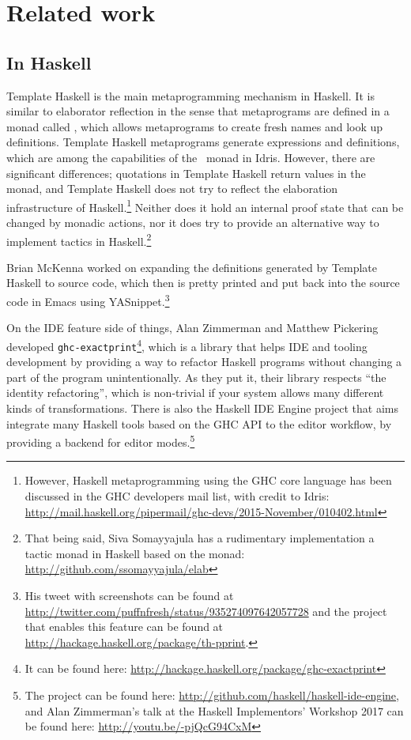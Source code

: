 \section{Related work} \label{sec:relatedwork}

\subsection{In Haskell}

Template Haskell \cite{th} is the main metaprogramming mechanism in Haskell.
It is similar to elaborator reflection in the sense that metaprograms are
defined in a monad called , which allows metaprograms to create fresh
names and look up definitions.
Template Haskell metaprograms generate expressions and definitions, which are
among the capabilities of the \Elab\ monad in Idris.
However, there are significant differences;
quotations in Template Haskell return values in the  monad, and Template
Haskell does not try to reflect the elaboration infrastructure of
Haskell.\footnote{However, Haskell metaprogramming using the GHC core language
has been discussed in the GHC developers mail list, with credit to Idris:
\url{http://mail.haskell.org/pipermail/ghc-devs/2015-November/010402.html}}
Neither does it hold an internal proof state that can be changed by monadic
actions, nor it does try to provide an alternative way to implement tactics in
Haskell.\footnote{That being said, Siva Somayyajula has a rudimentary
implementation a tactic monad in Haskell based on the  monad:
\url{http://github.com/ssomayyajula/elab}}

Brian McKenna worked on expanding the definitions generated by Template Haskell
to source code, which then is pretty printed and put back into the source code
in Emacs using YASnippet.\footnote{His tweet with screenshots can be found at
\url{http://twitter.com/puffnfresh/status/935274097642057728} and the project
that enables this feature can be found at
\url{http://hackage.haskell.org/package/th-pprint}.}

On the IDE feature side of things, Alan Zimmerman and Matthew Pickering
developed \texttt{ghc-exactprint}\footnote{It can be found here:
\url{http://hackage.haskell.org/package/ghc-exactprint}}, which is a library
that helps IDE and tooling development by providing a way to refactor Haskell
programs without changing a part of the program unintentionally. As they put
it, their library respects ``the identity refactoring'', which is non-trivial
if your system allows many different kinds of
transformations.\cite{ghc-exactprint-blog}
There is also the Haskell IDE Engine project that aims integrate many Haskell
tools based on the GHC API to the editor workflow, by providing a backend for
editor modes.\footnote{The project can be found here:
\url{http://github.com/haskell/haskell-ide-engine}, and Alan Zimmerman's talk
at the Haskell Implementors' Workshop 2017 can be found here:
\url{http://youtu.be/-pjQcG94CxM}}

